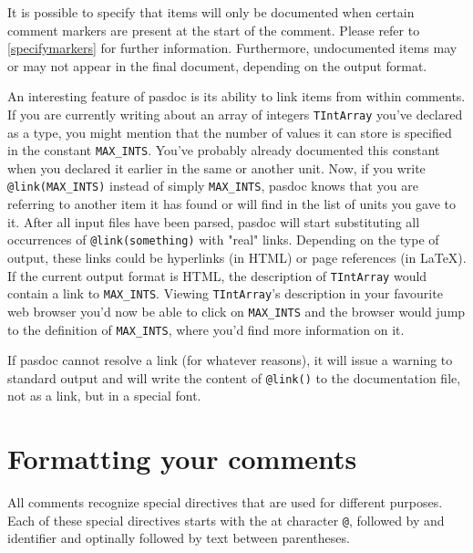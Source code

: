 \documentclass[11pt]{article}
\begin{document}
It is possible to specify that items will only be documented when certain
comment markers are present at the start of the comment. Please refer
to \ref{specifymarkers} for further information. Furthermore, undocumented
items may or may not appear in the final document, depending on the
output format.

An interesting feature of pasdoc is its ability to link items from within
comments. If you are currently writing about an array of integers {\tt TIntArray} you've
declared as a type, you might mention that the number of values it can store
is specified in the constant {\tt MAX\_INTS}.
You've probably already documented this constant when you declared it earlier
in the same or another unit.
Now, if you write {\tt @link(MAX\_INTS)} instead of simply {\tt MAX\_INTS},
pasdoc knows that you are referring to another item it has found or will find
in the list of units you gave to it.
After all input files have been parsed, pasdoc will start substituting all
occurrences of {\tt @link(something)} with "real" links.
Depending on the type of output, these links could be hyperlinks (in HTML)
or page references (in \LaTeX).
If the current output format is HTML, the description of {\tt TIntArray} would
contain a link to {\tt MAX\_INTS}.
Viewing {\tt TIntArray}'s description in your favourite web browser you'd
now be able to click on {\tt MAX\_INTS} and the browser would jump to the
definition of {\tt MAX\_INTS}, where you'd find more information on it.

If pasdoc cannot resolve a link (for whatever reasons), it will issue a
warning to standard output and will write the content of {\tt @link()}
to the documentation file, not as a link, but in a special font.

\section{Formatting your comments}

All comments recognize special directives that are used for different
purposes. Each of these special directives starts with the at character
{\tt @}, followed by and identifier and optinally followed by text
between parentheses.
\end{document}
